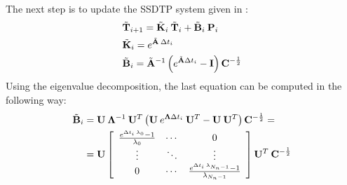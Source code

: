The next step is to update the SSDTP system given in :
\begin{align}
  & \tilde{\mathbf{T}}_{i+1} = \tilde{\mathbf{K}}_i \: \tilde{\mathbf{T}}_i + \tilde{\mathbf{B}}_i \: \mathbf{P}_i \label{eq:recurrent-equation} \\
  & \tilde{\mathbf{K}}_i = e^{\tilde{\mathbf{A}} \: \Delta t_i} \nonumber \\
  & \tilde{\mathbf{B}}_i = \tilde{\mathbf{A}}^{-1} \left( e^{\tilde{\mathbf{A}} \Delta t_i} - \mathbf{I} \right) \mathbf{C}^{-\frac{1}{2}} \nonumber
\end{align}
Using the eigenvalue decomposition, the last equation can be computed in the following way:
\begin{align*}
  \tilde{\mathbf{B}}_i & = \mathbf{U} \: \mathbf{\Lambda}^{-1} \: \mathbf{U}^T \left(\mathbf{U} \: e^{\mathbf{\Lambda} \Delta t_i} \: \mathbf{U}^T - \mathbf{U} \: \mathbf{U}^T \right) \mathbf{C}^{-\frac{1}{2}} = \\
      & = \mathbf{U} \left[
        \begin{array}{ccc}
          \frac{e^{\Delta t_i \: \lambda_0} - 1}{\lambda_0} & \cdots & 0 \\
          \vdots & \ddots & \vdots \\
          0 & \cdots & \frac{e^{\Delta t_i \: \lambda_{N_n - 1}} - 1}{\lambda_{N_n - 1}}
        \end{array}
      \right] \mathbf{U}^T \: \mathbf{C}^{-\frac{1}{2}}
\end{align*}

